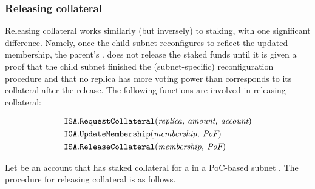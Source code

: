 \subsubsection{Releasing collateral}

Releasing collateral works similarly (but inversely) to staking, with one significant difference.
Namely, once the child subnet  reconfigures to reflect the updated membership, the parent's \saFull {}. does not release the staked funds
until it is given a proof that the child subnet  finished the (subnet-specific) reconfiguration procedure
and that no replica has more voting power than corresponds to its collateral after the release.
The following functions are involved in releasing collateral:

\begin{align*}
    \texttt{ISA}.&\texttt{RequestCollateral}(\textit{replica, amount, account})\\
    \texttt{IGA}.&\texttt{UpdateMembership}(\textit{membership, \textit{PoF}})\\
    \texttt{ISA}.&\texttt{ReleaseCollateral}(\textit{membership, \textit{PoF}})
\end{align*}

Let  be an account that has staked collateral for a  in a PoC-based subnet .
The procedure for releasing collateral is as follows.

